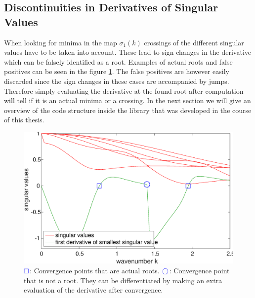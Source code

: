 \documentclass[a4paper, oneside]{discothesis}
\begin{document}
\subsection{Discontinuities in Derivatives of Singular Values}
When looking for minima in the map $\sigma_1(k)$ crossings of the different singular values have to be taken into account.
These lead to sign changes in the derivative which can be falsely identified as a root.
Examples of actual roots and false positives can be seen in the figure \ref{fig:crossings}.
The false positives are however easily discarded since the sign changes in these cases are accompanied by jumps.
Therefore simply evaluating the derivative at the found root after computation will tell if it is an actual minima or a crossing.
In the next section we will give an overview of the code structure inside the library that was developed in the course of this thesis.
\begin{figure} [H]
	\centering
	\includegraphics[width=\columnwidth]{figures/crossings.eps}
	\caption{ 
		$\textcolor{blue}\square$: Convergence points that are actual roots.
		$\textcolor{blue}\bigcirc$: Convergence point that is not a root.
		They can be differentiated by making an extra evaluation of the derivative after convergence.
	}
	\label{fig:crossings}
\end{figure}
\end{document}
